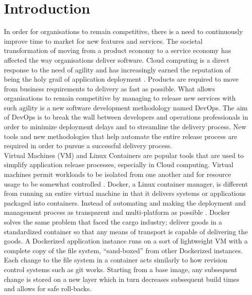 \chapter{Introduction}
In order for organisations to remain competitive, there is a need to continuously improve time to market for new features and services. The societal transformation of moving from a product economy to a service economy has affected the way organisations deliver software. Cloud computing is a direct response to the need of agility and has increasingly earned the reputation of being the holy grail of application deployment \cite{7034713}. Products are required to move from business requirements to delivery as fast as possible. What allows organisations to remain competitive by managing to release new services with such agility is a new software development methodology named DevOps. The aim of DevOps is to break the wall between developers and operations professionals in order to minimize deployment delays and to streamline the delivery process. New tools and new methodologies that help automate the entire release process are required in order to pursue a successful delivery process.\\

Virtual Machines (VM) and Linux Containers are popular tools that are used to simplify application release processes, especially in Cloud computing. Virtual machines permit workloads to be isolated from one another and for resource usage to be somewhat controlled \cite{7095802}. Docker, a Linux container manager, is different from running an entire virtual machine in that it delivers systems or applications packaged into containers. Instead of automating and making the deployment and management process as transparent and multi-platform as possible \cite{7095802}. Docker solves the same problem that faced the cargo industry; deliver goods in a standardized container so that any means of transport is capable of delivering the goods. A Dockerized application instance runs on a sort of lightweight VM with a complete copy of the file system, “sand-boxed” from other Dockerized instances. Each change to the file system in a container acts similarly to how revision control systems such as git works. Starting from a base image, any subsequent change is stored on a new layer which in turn decreases subsequent build times and allows for safe roll-backs.\\

